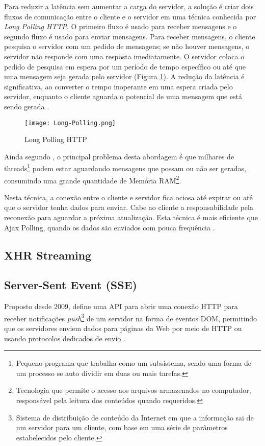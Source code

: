 Para reduzir a latência sem aumentar a carga do servidor, a solução é criar dois fluxos de comunicação entre o cliente e o servidor em uma técnica conhecida por \emph{Long Polling HTTP}. O primeiro fluxo é usado para receber mensagens e o segundo fluxo é usado para enviar mensagens. Para receber mensagens, o cliente pesquisa o servidor com um pedido de mensagens; se não houver mensagens, o servidor não responde com uma resposta imediatamente. O servidor coloca o pedido de pesquisa em espera por um período de tempo específico ou até que uma mensagem seja gerada pelo servidor  (Figura \ref{fig:longPolling}). A redução da latência é significativa, ao converter o tempo inoperante em uma espera criada pelo servidor, enquanto o cliente aguarda o potencial de uma mensagem que está sendo gerada \cite{gross2006introduction}.

\begin{figure}[!htb]
	\centering
	\texttt{[image: Long-Polling.png]}
	\caption{Long Polling HTTP}
	\label{fig:longPolling}
\end{figure}

Ainda segundo , o principal problema desta abordagem é que milhares de threads\footnote{Pequeno programa que trabalha como um subsistema, sendo uma forma de um processo se auto dividir em duas ou mais tarefas.} podem estar aguardando mensagens que possam ou não ser geradas, consumindo uma grande quantidade de Memória RAM\footnote{Tecnologia que permite o acesso aos arquivos armazenados no computador, responsável pela leitura dos conteúdos quando requeridos.}.

Nesta técnica, a conexão entre o cliente e servidor fica ociosa até expirar ou até que o servidor tenha dados para enviar. Cabe ao cliente a responsabilidade pela reconexão para aguardar a próxima atualização. Esta técnica é mais eficiente que Ajax Polling, quando os dados são enviados com pouca frequência \cite{gutwin2011real}.

\subsection{XHR Streaming}


\subsection{Server-Sent Event (SSE)}

Proposto desde 2009, define uma API para abrir uma conexão HTTP para receber notificações \emph{push}\footnote{Sistema de distribuição de conteúdo da Internet em que a informação sai de um servidor para um cliente, com base em uma série de parâmetros estabelecidos pelo cliente.} de um servidor na forma de eventos DOM, permitindo que os servidores enviem dados para páginas da Web por meio de HTTP ou usando protocolos dedicados de envio \cite{hicksonserver2015}.

